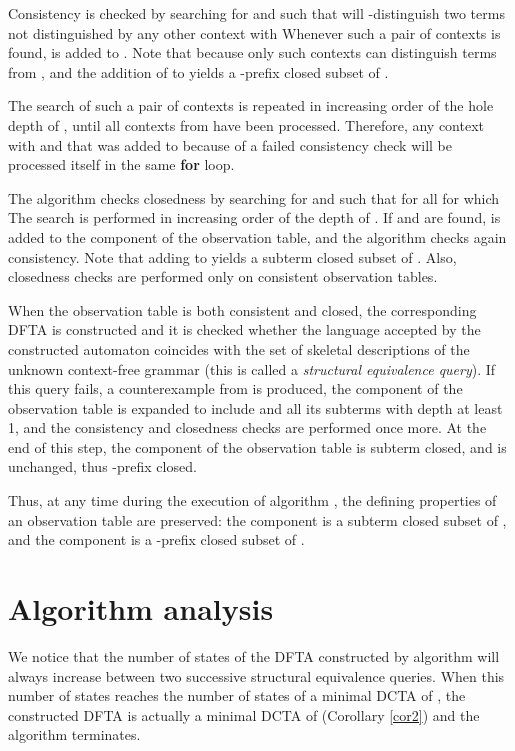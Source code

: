 \documentclass[preprint,12pt,english]{article}
\begin{document}
Consistency is checked by searching for  and  such that  will -distinguish  two terms   not distinguished by any other context   with  Whenever such a pair of contexts  is found,   is added to . Note that 
 because only such contexts can distinguish terms from , and the addition of  to  yields a -prefix closed subset of .


The search of such a pair of contexts  is repeated in increasing order of the hole depth of , until all contexts from  have been processed. Therefore, any context  with  and  that was added to  because of a failed consistency check will be processed itself in the same {\bf for} loop.

The algorithm checks closedness by searching for  and  such that  for all  for which  The search is performed in increasing order of the depth of . If  and  are found,   is added to the  component of the observation table, and the algorithm checks again  consistency.  Note that adding  to  yields a subterm closed subset of . Also, closedness checks are performed only on consistent observation tables.

When the observation table is both consistent and closed, the corresponding DFTA is constructed and it is checked whether the language accepted by the constructed automaton coincides with the set of skeletal descriptions of the unknown context-free grammar  (this is called a {\em structural equivalence query}). If this query fails, a counterexample from  is produced,  the component  of the observation table is expanded to include  and all its subterms with depth at least 1, and the consistency and closedness checks are performed once more. At the end of this step, the component  of the observation table is subterm closed, and  is unchanged, thus -prefix closed.

Thus, at any time during the execution of algorithm , the defining properties of an observation table are preserved:
the component  is a subterm closed subset of , and
the component  is a -prefix closed subset of .


\section{Algorithm analysis}
\label{sect5}
We notice that the number of states of the DFTA constructed by algorithm  will always increase between two successive structural equivalence queries. When this number of states reaches the number of states of a minimal DCTA of , the constructed DFTA is actually a minimal DCTA of  (Corollary \ref{cor2}) and the algorithm terminates.
\end{document}
